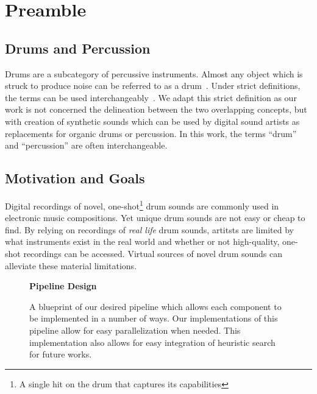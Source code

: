 \documentclass[runningheads,a4paper]{llncs}
\begin{document}
\section{Preamble}
\subsection{Drums and Percussion}
Drums are a subcategory of percussive instruments. Almost any object which is struck to produce noise can be referred to as a drum~\cite{latham2002oxford}. Under strict definitions, the terms can be used interchangeably~\cite{latham2002oxford}. We adapt this strict definition as our work is not concerned the delineation between the two overlapping concepts, but with creation of synthetic sounds which can be used by digital sound artists as replacements for organic drums or percussion. In this work, the terms \enquote{drum} and \enquote{percussion} are often interchangeable.

\subsection{Motivation and Goals}
Digital recordings of novel, one-shot\footnote{A single hit on the drum that captures its capabilities} drum sounds are commonly used in  electronic music compositions. Yet unique drum sounds are not easy or cheap to find. By relying on recordings of \textit{real life} drum sounds, artitsts are limited by what instruments exist in the real world and whether or not high-quality, one-shot recordings can be accessed. Virtual sources of novel drum sounds can alleviate these material limitations.

 \begin{figure}
    \begin{center}
    \textbf{Pipeline Design}
    \end{center}
    \caption{A blueprint of our desired pipeline which allows each component to be implemented in a number of ways. Our implementations of this pipeline allow for easy parallelization when needed. This implementation also allows for easy integration of heuristic search for future works.
    }
\label{fig:pipeline_outline}
\end{figure}
\end{document}

